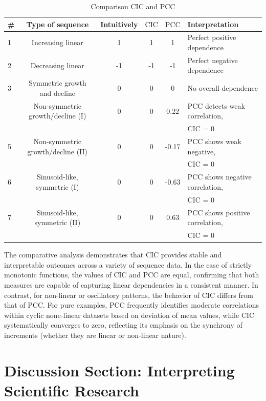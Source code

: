 \documentclass[aos]{imsart}
\newcommand{\cic}{\text{CIC}}
\newcommand{\pcc}{\text{PCC}}
\begin{document}
\begin{table}
\caption{Comparison $\cic$ and $\pcc$}
\label{table1}
\begin{tabular}{@{}lccccl@{}}
\hline
\# &
Type of sequence &
Intuitively &
$\cic$ &
$\pcc$ &
Interpretation \\
\hline
1 & Increasing linear               & 1  & 1 & 1    & Perfect positive dependence \\
2 & Decreasing linear               & -1 & -1 & -1  & Perfect negative dependence \\
3 & Symmetric growth and decline    & 0  & 0 & 0    & No overall dependence \\
 & Non-symmetric growth/decline (I) & 0 & 0 & 0.22 
  & $\pcc$ detects weak correlation,\\
  & & & & & $\cic$ = 0 \\
5 & Non-symmetric growth/decline (II)& 0  & 0 & -0.17 
  & $\pcc$ shows weak negative,\\
  & & & & & $\cic$ = 0 \\
6 & Sinusoid-like, symmetric (I)     & 0  & 0 & -0.63 
  & $\pcc$ shows negative correlation,\\
  & & & & & $\cic$ = 0 \\
7 & Sinusoid-like, symmetric (II)    & 0  & 0 & 0.63 
  & $\pcc$ shows positive correlation,\\
  & & & & & $\cic$ = 0 \\
\hline
\end{tabular}
\end{table}

The comparative analysis demonstrates that $\cic$ provides stable and interpretable outcomes across a variety of sequence data. In the case of strictly monotonic functions, the values of $\cic$ and $\pcc$ are equal, confirming that both measures are capable of capturing linear dependencies in a consistent manner.
In contrast, for non-linear or oscillatory patterns, the behavior of $\cic$ differs from that of $\pcc$. For pure examples, $\pcc$ frequently identifies moderate correlations within cyclic none-linear datasets based on deviation of mean values, while $\cic$ systematically converges to zero, reflecting its emphasis on the synchrony of increments (whether they are linear or non-linear nature).

\section{Discussion Section: Interpreting Scientific Research}
\end{document}
